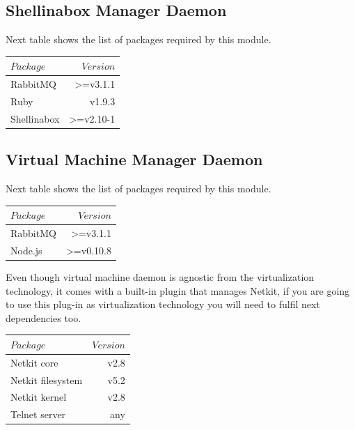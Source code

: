 \documentclass{article}
\begin{document}
\subsection{Shellinabox Manager Daemon}
\label{sub:ShellManager}
Next table shows the list of packages required by this module.

\begin{center}
\begin{tabular}{|l|r|}
	\hline
$Package$ & $Version$  \\
	\hline
RabbitMQ & \textgreater=v3.1.1 \\
Ruby & v1.9.3 \\
Shellinabox & \textgreater=v2.10-1 \\
	\hline
\end{tabular}
\end{center}

\subsection{Virtual Machine Manager Daemon}
\label{sub:VMManager}
Next table shows the list of packages required by this module.

\begin{center}
\begin{tabular}{|l|r|}
	\hline
$Package$ & $Version$  \\
	\hline
RabbitMQ & \textgreater=v3.1.1 \\
Node.js & \textgreater=v0.10.8 \\
	\hline
\end{tabular}
\end{center}

Even though virtual machine daemon is agnostic from the virtualization technology, it comes with a built-in plugin that manages Netkit, if you are going to use this plug-in as virtualization technology you will need to fulfil next dependencies too.

\begin{center}
\begin{tabular}{|l|r|}
	\hline
$Package$ & $Version$  \\
	\hline
Netkit core & v2.8 \\
Netkit filesystem & v5.2 \\
Netkit kernel & v2.8 \\
Telnet server & any \\
	\hline
\end{tabular}
\end{center}
\end{document}
